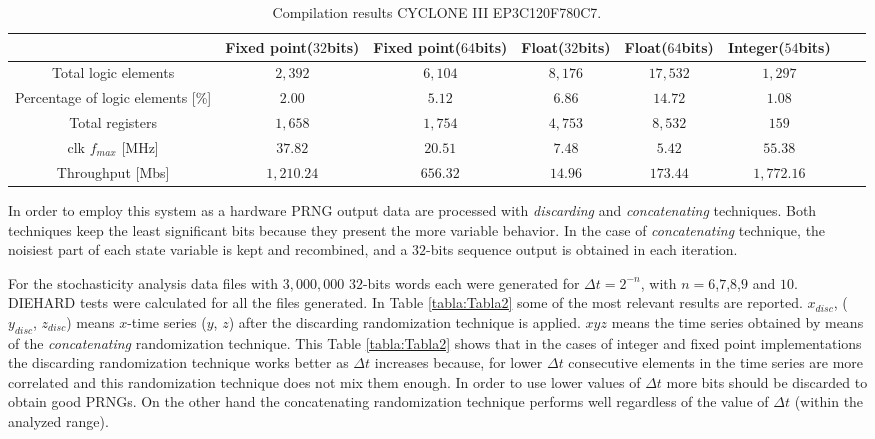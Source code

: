 \begin{table*} [tb]
\begin{center}
\caption{Compilation results CYCLONE III  EP3C120F780C7.}
\begin{tabular}{|c|c|c|c|c|c|c|c|}
\hline\hline
               &Fixed point($32$bits) &Fixed point($64$bits)   &  Float($32$bits)  &  Float($64$bits)  &  Integer($54$bits)       \\
\hline\hline
Total logic elements           &$2,392$    &$6,104$     &$8,176$              &$17,532$          &    $1,297$   \\
 \hline
Percentage of logic elements [\%] &$2.00$ &$5.12$     &$6.86$              &$14.72$          &    $1.08$   \\
 \hline
Total registers                  &$1,658$            &$1,754$       & $4,753$              &$8,532  $        & $ 159 $ \\
\hline \hline
clk $f_{max}$ [MHz]         &$37.82$         &$20.51$      &$7.48$          &$5.42$     & $55.38$ \\
 \hline
Throughput [Mbs]       &$1,210.24$ &     $656.32$         &$14.96$              &$173.44$          &    $1,772.16$   \\
 \hline\hline
\end{tabular}\end{center}

\label{tabla:Tabla1}
\end{table*}

In order to employ this system as a hardware PRNG output data are
processed with \textit{discarding} and \textit{concatenating}
techniques. Both techniques keep the least significant bits
because they present the more variable behavior. In the case of
\textit{concatenating} technique, the noisiest part of each state
variable is kept and recombined, and a $32$-bits sequence output
is obtained in each iteration.

For the stochasticity analysis data files with $3,000,000$
$32$-bits words each were generated for $\Delta t=2^{-n}$, with
$n=6$,$7$,$8$,$9$ and $10$. DIEHARD tests were calculated for all
the files generated. In Table \ref{tabla:Tabla2} some of the most
relevant results are reported. $x_{disc}$, ( $y_{disc}$,
$z_{disc}$) means $x$-time series ($y$, $z$) after the discarding
randomization technique is applied. $xyz$ means the time series
obtained by means of the \textit{concatenating} randomization
technique. This Table \ref{tabla:Tabla2} shows that in the cases
of integer and fixed point implementations the discarding
randomization technique works better as $\Delta t$ increases
because, for lower $\Delta t$ consecutive elements in the time
series are more correlated and this randomization technique does
not mix them enough. In order to use lower values of  $\Delta t$
more bits should be discarded to obtain good PRNGs. On the other
hand the concatenating randomization technique performs well
regardless of the value of $\Delta t$ (within the analyzed range).

